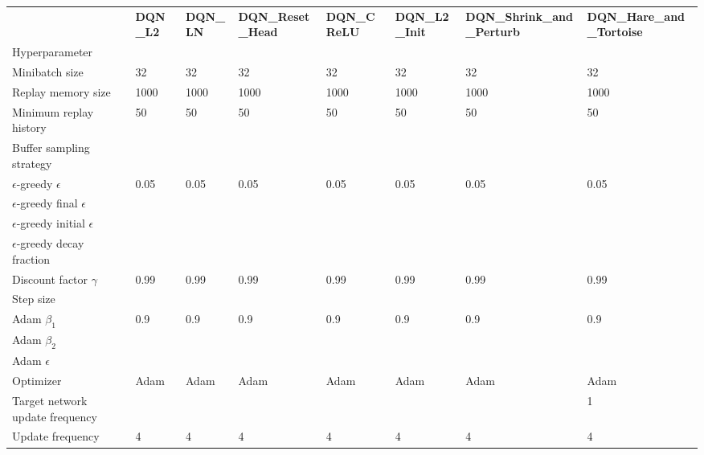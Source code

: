 \begin{tabular}{llllllll}
 & \bfseries DQN_L2 & \bfseries DQN_LN & \bfseries DQN_Reset_Head & \bfseries DQN_CReLU & \bfseries DQN_L2_Init & \bfseries DQN_Shrink_and_Perturb & \bfseries DQN_Hare_and_Tortoise \\
Hyperparameter &  &  &  &  &  &  &  \\
Minibatch size & 32 & 32 & 32 & 32 & 32 & 32 & 32 \\
Replay memory size & 1000 & 1000 & 1000 & 1000 & 1000 & 1000 & 1000 \\
Minimum replay history & 50 & 50 & 50 & 50 & 50 & 50 & 50 \\
Buffer sampling strategy &  &  &  &  &  &  &  \\
$\epsilon$-greedy $\epsilon$ & 0.05 & 0.05 & 0.05 & 0.05 & 0.05 & 0.05 & 0.05 \\
$\epsilon$-greedy final $\epsilon$ &  &  &  &  &  &  &  \\
$\epsilon$-greedy initial $\epsilon$ &  &  &  &  &  &  &  \\
$\epsilon$-greedy decay fraction &  &  &  &  &  &  &  \\
Discount factor $\gamma$ & 0.99 & 0.99 & 0.99 & 0.99 & 0.99 & 0.99 & 0.99 \\
Step size &  &  &  &  &  &  &  \\
Adam $\beta_1$ & 0.9 & 0.9 & 0.9 & 0.9 & 0.9 & 0.9 & 0.9 \\
Adam $\beta_2$ &  &  &  &  &  &  &  \\
Adam $\epsilon$ &  &  &  &  &  &  &  \\
Optimizer & Adam & Adam & Adam & Adam & Adam & Adam & Adam \\
Target network update frequency &  &  &  &  &  &  & 1 \\
Update frequency & 4 & 4 & 4 & 4 & 4 & 4 & 4 \\
\end{tabular}
